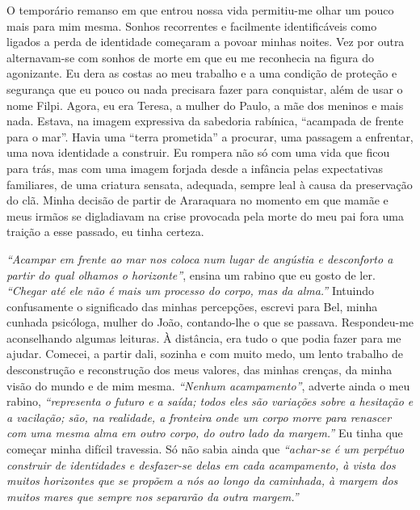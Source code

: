 O temporário remanso em que entrou nossa vida permitiu-me olhar um pouco mais para mim mesma.
Sonhos recorrentes e facilmente identificáveis como ligados a perda de identidade começaram a povoar minhas noites.
Vez por outra alternavam-se com sonhos de morte em que eu me reconhecia na figura do agonizante.
Eu dera as costas ao meu trabalho e a uma condição de proteção e segurança que eu pouco ou nada precisara fazer para conquistar, além de usar o nome Filpi.
Agora, eu era Teresa, a mulher do Paulo, a mãe dos meninos e mais nada.
Estava, na imagem expressiva da sabedoria rabínica, ``acampada de frente para o mar''.
Havia uma ``terra prometida'' a procurar, uma passagem a enfrentar, uma nova identidade a construir.
Eu rompera não só com uma vida que ficou para trás, mas com uma imagem forjada desde a infância pelas expectativas familiares, de uma criatura sensata, adequada, sempre leal à causa da preservação do clã.
Minha decisão de partir de Araraquara no momento em que mamãe e meus irmãos se digladiavam na crise provocada pela morte do meu pai fora uma traição a esse passado, eu tinha certeza.


\textit{``Acampar em frente ao mar nos coloca num lugar de angústia e desconforto a partir do qual olhamos o horizonte''}, ensina um rabino que eu gosto de ler.
\textit{``Chegar até ele não é mais um processo do corpo, mas da alma.''} Intuindo confusamente o significado das minhas percepções, escrevi para Bel, minha cunhada psicóloga, mulher do João, contando-lhe o que se passava.
Respondeu-me aconselhando algumas leituras.
À distância, era tudo o que podia fazer para me ajudar.
Comecei, a partir dali, sozinha e com muito medo, um lento trabalho de desconstrução e reconstrução dos meus valores, das minhas crenças, da minha visão do mundo e de mim mesma.
\textit{``Nenhum acampamento''}, adverte ainda o meu rabino, \textit{``representa o futuro e a saída; todos eles são variações sobre a hesitação e a vacilação; são, na realidade, a fronteira onde um corpo morre para renascer com uma mesma alma em outro corpo, do outro lado da margem.''} 
Eu tinha que começar minha difícil travessia.
Só não sabia ainda que \textit{``achar-se é um perpétuo construir de identidades e desfazer-se delas em cada acampamento, à vista dos muitos horizontes que se propõem a nós ao longo da caminhada, à margem dos muitos mares que sempre nos separarão da outra margem.''}

